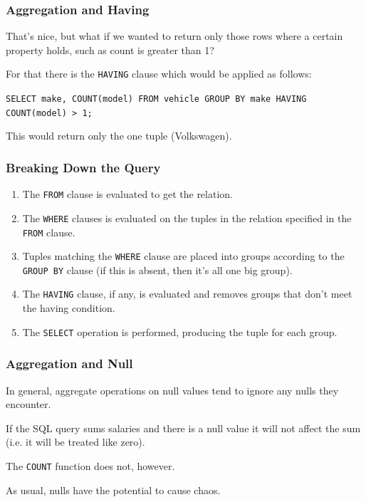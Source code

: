 \begin{frame}
\frametitle{Aggregation and Having}

That's nice, but what if we wanted to return only those rows where a certain property holds, such as count is greater than 1? 

For that there is the \texttt{HAVING} clause which would be applied as follows: 

\texttt{SELECT make, COUNT(model) FROM vehicle GROUP BY make HAVING COUNT(model) > 1;} 

This would return only the one tuple (Volkswagen).

\end{frame}



\begin{frame}
\frametitle{Breaking Down the Query}

\begin{enumerate}
	\item The \texttt{FROM} clause is evaluated to get the relation.
	\item The \texttt{WHERE} clauses is evaluated on the tuples in the relation specified in the \texttt{FROM} clause.
	\item Tuples matching the \texttt{WHERE} clause are placed into groups according to the \texttt{GROUP BY} clause (if this is absent, then it's all one big group).
	\item The \texttt{HAVING} clause, if any, is evaluated and removes groups that don't meet the having condition.
	\item The \texttt{SELECT} operation is performed, producing the tuple for each group.
\end{enumerate}

\end{frame}



\begin{frame}
\frametitle{Aggregation and Null}


In general, aggregate operations on null values tend to ignore any nulls they encounter.

If the SQL query sums salaries and there is a null value it will not affect the sum (i.e. it will be treated like zero). 

The \texttt{COUNT} function does not, however. 

As usual, nulls have the potential to cause chaos.

\end{frame}



